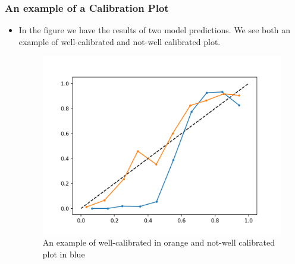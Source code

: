 \documentclass[9pt]{beamer}
\begin{document}
\begin{frame}
\frametitle{An example of a Calibration Plot}
\begin{itemize}
\item In the figure we have the results of two model predictions. We see both an example of well-calibrated and not-well calibrated plot. 
\begin{figure}[ht]
\includegraphics[scale=0.25]{images/Calibrated-and-Uncalibrated.png}
\caption{An example of well-calibrated in orange and not-well calibrated plot in blue}
\end{figure}
\end{itemize}
\end{frame}
\end{document}
